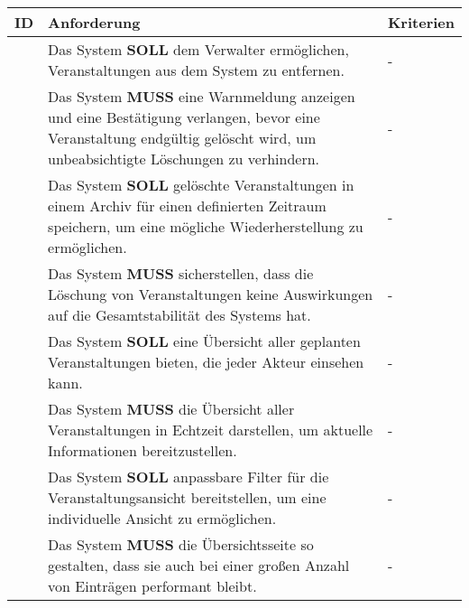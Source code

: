 \begin{tabular} {|p{}|p{}|p{}|}
	\hline
	ID & Anforderung & Kriterien \\
	\hline
	\printfreqnr
	& Das System \textbf{SOLL} dem Verwalter ermöglichen, Veranstaltungen aus dem System zu entfernen. 
	& - \\
	\hline
	\printfreqnr
	& Das System \textbf{MUSS} eine Warnmeldung anzeigen und eine Bestätigung verlangen, bevor eine Veranstaltung endgültig gelöscht wird, um unbeabsichtigte Löschungen zu verhindern. 
	& - \\
	\hline
	\printfreqnr
	& Das System \textbf{SOLL} gelöschte Veranstaltungen in einem Archiv für einen definierten Zeitraum speichern, um eine mögliche Wiederherstellung zu ermöglichen. 
	& - \\
	\hline
	\printfreqnr
	& Das System \textbf{MUSS} sicherstellen, dass die Löschung von Veranstaltungen keine Auswirkungen auf die Gesamtstabilität des Systems hat. 
	& - \\
	\hline
	\printfreqnr
	& Das System \textbf{SOLL} eine Übersicht aller geplanten Veranstaltungen bieten, die jeder Akteur einsehen kann. 
	& - \\
	\hline
	\printfreqnr
	& Das System \textbf{MUSS} die Übersicht aller Veranstaltungen in Echtzeit darstellen, um aktuelle Informationen bereitzustellen. 
	& - \\
	\hline
	\printfreqnr
	& Das System \textbf{SOLL} anpassbare Filter für die Veranstaltungsansicht bereitstellen, um eine individuelle Ansicht zu ermöglichen. 
	& - \\
	\hline
	\printfreqnr
	& Das System \textbf{MUSS} die Übersichtsseite so gestalten, dass sie auch bei einer großen Anzahl von Einträgen performant bleibt. 
	& - \\
	\hline
\end{tabular}

\newpage

